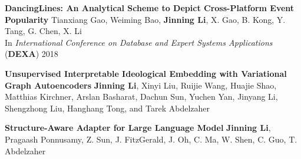 \documentclass[12pt, letterpaper]{article}
\newcommand{\mhead}[1]{\leavevmode\marginpar{\sffamily\footnotesize #1}}
\begin{document}
\textbf{DancingLines: An Analytical Scheme to Depict Cross-Platform Event Popularity}
\href{http://jinningli.cn/cv/dancinglines.pdf}{}\href{https://github.com/jinningli/dancinglines}{}\newline
\footnotesize
Tianxiang Gao, Weiming Bao, \textbf{Jinning Li}, X. Gao, B. Kong, Y. Tang, G. Chen, X. Li\\
In \emph{International Conference on Database and Expert Systems Applications} (\textbf{DEXA}) 2018
\small

\medskip
\mhead{\normalsize{Manuscripts}}\small
\textbf{Unsupervised Interpretable Ideological Embedding with Variational Graph Autoencoders}
\href{http://jinningli.cn/files/papers/interpretable.pdf}{}
\newline
\footnotesize
\textbf{Jinning Li}, Xinyi Liu, Ruijie Wang, Huajie Shao, Matthias Kirchner, Arslan Basharat, Dachun Sun, Yuchen Yan, Jinyang Li, Shengzhong Liu, Hanghang Tong, and Tarek Abdelzaher
\small
\vspace{2pt}

\textbf{Structure-Aware Adapter for Large Language Model}
\href{http://jinningli.cn/files/papers/structure_aware.pdf}{}
\newline
\footnotesize
\textbf{Jinning Li}, Pragaash Ponnusamy, Z. Sun, J. FitzGerald, J. Oh, C. Ma, W. Shen, C. Guo, T. Abdelzaher
\small
\vspace{2pt}

%
\end{document}
